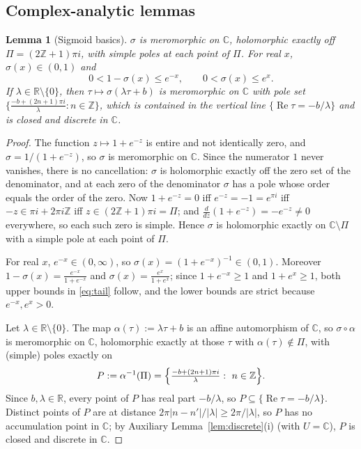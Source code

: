 \documentclass[11pt]{article}
\newtheorem{lemma}[theorem]{Lemma}
\theoremstyle{definition}
\theoremstyle{remark}
\theoremstyle{plain}
\newcommand{\R}{\mathbb{R}}
\newcommand{\C}{\mathbb{C}}
\newcommand{\Z}{\mathbb{Z}}
\newcommand{\sig}{\sigma}
\begin{document}
\subsection{Complex-analytic lemmas}

\begin{lemma}[Sigmoid basics]\label{lem:sigmoid}
$\sig$ is meromorphic on $\C$, holomorphic exactly off $\Pi=(2\Z+1)\pi i$, with simple
poles at each point of $\Pi$.  For real $x$, $\sig(x)\in(0,1)$ and
\begin{equation}\label{eq:tail}
0<1-\sig(x)\le e^{-x},\qquad 0<\sig(x)\le e^{x}.
\end{equation}
If $\lambda\in\R\setminus\{0\}$, then $\tau\mapsto\sig(\lambda\tau+b)$ is meromorphic on
$\C$ with pole set $\big\{\frac{-b+(2n+1)\pi i}{\lambda}:n\in\Z\big\}$, which is contained
in the vertical line $\{\operatorname{Re}\tau=-b/\lambda\}$ and is closed and discrete in
$\C$.
\end{lemma}

\begin{proof}
The function $z\mapsto 1+e^{-z}$ is entire and not identically zero, and
$\sig=1/(1+e^{-z})$, so $\sig$ is meromorphic on $\C$.  Since the numerator $1$ never
vanishes, there is no cancellation: $\sig$ is holomorphic exactly off the zero set of the
denominator, and at each zero of the denominator $\sig$ has a pole whose order equals the
order of the zero.  Now $1+e^{-z}=0$ iff $e^{-z}=-1=e^{\pi i}$ iff $-z\in\pi i+2\pi i\Z$
iff $z\in(2\Z+1)\pi i=\Pi$; and $\frac{d}{dz}(1+e^{-z})=-e^{-z}\neq0$ everywhere, so each
such zero is simple.  Hence $\sig$ is holomorphic exactly on $\C\setminus\Pi$ with a
simple pole at each point of $\Pi$.

For real $x$, $e^{-x}\in(0,\infty)$, so $\sig(x)=(1+e^{-x})^{-1}\in(0,1)$.  Moreover
$1-\sig(x)=\frac{e^{-x}}{1+e^{-x}}$ and $\sig(x)=\frac{e^{x}}{1+e^{x}}$; since
$1+e^{-x}\ge1$ and $1+e^{x}\ge1$, both upper bounds in \eqref{eq:tail} follow, and the
lower bounds are strict because $e^{-x},e^{x}>0$.

Let $\lambda\in\R\setminus\{0\}$.  The map $\alpha(\tau):=\lambda\tau+b$ is an affine
automorphism of $\C$, so $\sig\circ\alpha$ is meromorphic on $\C$, holomorphic exactly at
those $\tau$ with $\alpha(\tau)\notin\Pi$, with (simple) poles exactly on
\[
P:=\alpha^{-1}(\Pi)=\Bigl\{\tfrac{-b+(2n+1)\pi i}{\lambda}:\ n\in\Z\Bigr\}.
\]
Since $b,\lambda\in\R$, every point of $P$ has real part $-b/\lambda$, so
$P\subseteq\{\operatorname{Re}\tau=-b/\lambda\}$.  Distinct points of $P$ are at distance
$2\pi|n-n'|/|\lambda|\ge 2\pi/|\lambda|$, so $P$ has no accumulation point in $\C$; by
Auxiliary Lemma~\ref{lem:discrete}(i) (with $U=\C$), $P$ is closed and discrete in $\C$.
\end{proof}
\end{document}
